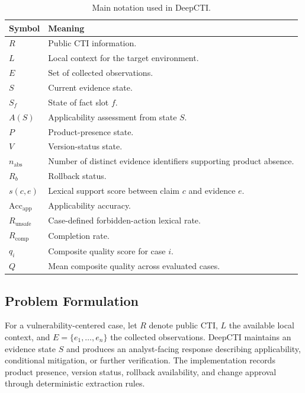 \documentclass[conference]{IEEEtran}
\begin{document}
\begin{table}[!t]
\caption{Main notation used in DeepCTI.}
\label{tab:notation}
\centering
\scriptsize
\setlength{\tabcolsep}{3.5pt}
\renewcommand{\arraystretch}{1.08}
\begin{tabularx}{\columnwidth}{
    >{\centering\arraybackslash}p{}
    >{\raggedright\arraybackslash}X
}
\toprule
\textbf{Symbol} & \textbf{Meaning} \\
\midrule
$R$ & Public CTI information. \\
$L$ & Local context for the target environment. \\
$E$ & Set of collected observations. \\
$S$ & Current evidence state. \\
$S_f$ & State of fact slot $f$. \\
$A(S)$ & Applicability assessment from state $S$. \\
$P$ & Product-presence state. \\
$V$ & Version-status state. \\
$n_{\mathrm{abs}}$ & Number of distinct evidence identifiers supporting product absence. \\
$R_b$ & Rollback status. \\
$s(c,e)$ & Lexical support score between claim $c$ and evidence $e$. \\
$\mathrm{Acc}_{\mathrm{app}}$ & Applicability accuracy. \\
$R_{\mathrm{unsafe}}$ & Case-defined forbidden-action lexical rate. \\
$R_{\mathrm{comp}}$ & Completion rate. \\
$q_i$ & Composite quality score for case $i$. \\
$Q$ & Mean composite quality across evaluated cases. \\
\bottomrule
\end{tabularx}
\end{table}

\subsection{Problem Formulation}

For a vulnerability-centered case, let $R$ denote public CTI,
$L$ the available local context, and $E=\{e_1,\ldots,e_n\}$ the
collected observations. DeepCTI maintains an evidence state $S$
and produces an analyst-facing response describing applicability,
conditional mitigation, or further verification. The implementation
records product presence, version status, rollback availability, and
change approval through deterministic extraction rules.
\end{document}

